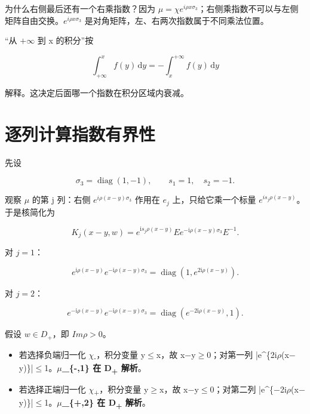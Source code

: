为什么右侧最后还有一个右乘指数？因为 $\mu{}=\chi{} e^{i\rho{}x\sigma{}_{3}}$；右侧乘指数不可以与左侧矩阵自由交换。$e^{i\rho{}x\sigma{}_{3}}$ 是对角矩阵，左、右两次指数属于不同乘法位置。\par

“从 $+\infty{}$ 到 x 的积分”按\par

\[
\int_{+\infty}^{x}f(y)\,\mathrm{d}y
=-\int_x^{+\infty}f(y)\,\mathrm{d}y
\]

解释。这决定后面哪一个指数在积分区域内衰减。\par

\section{逐列计算指数有界性}
\par

先设\par

\[
\sigma_3=\operatorname{diag}(1,-1),\qquad
s_1=1,\quad s_2=-1.
\]

观察 $\mu{}$ 的第 j 列：右侧 $e^{i\rho{}(x-y)\sigma{}_{3}}$ 作用在 $e_j$ 上，只给它乘一个标量 $e^{i s_j \rho{}(x-y)}$。于是核简化为\par

\[
K_j(x-y,w)=e^{\mathrm{i}s_j\rho(x-y)}
E e^{-\mathrm{i}\rho(x-y)\sigma_3}E^{-1}.
\]

对 $j=1$：\par

\[
e^{\mathrm{i}\rho(x-y)}
e^{-\mathrm{i}\rho(x-y)\sigma_3}
=\operatorname{diag}(1,e^{2\mathrm{i}\rho(x-y)}).
\]

对 $j=2$：\par

\[
e^{-\mathrm{i}\rho(x-y)}
e^{-\mathrm{i}\rho(x-y)\sigma_3}
=\operatorname{diag}(e^{-2\mathrm{i}\rho(x-y)},1).
\]

假设 $w\in{}D_{+}$，即 $Im\rho{}>0$。\par

\begin{itemize}[leftmargin=2em]
\item 若选择负端归一化 \ensuremath{\chi}\textsubscript{-}，积分变量 y\ensuremath{\le}x，故 x\ensuremath{-}y\ensuremath{\ge}0；对第一列 |e\textasciicircum{}\{2i\ensuremath{\rho}(x\ensuremath{-}y)\}|\ensuremath{\le}1。\textbf{\ensuremath{\mu}\_\{-,1\} 在 D\textsubscript{+} 解析}。
\item 若选择正端归一化 \ensuremath{\chi}\textsubscript{+}，积分变量 y\ensuremath{\ge}x，故 x\ensuremath{-}y\ensuremath{\le}0；对第二列 |e\textasciicircum{}\{\ensuremath{-}2i\ensuremath{\rho}(x\ensuremath{-}y)\}|\ensuremath{\le}1。\textbf{\ensuremath{\mu}\_\{+,2\} 在 D\textsubscript{+} 解析}。
\end{itemize}

